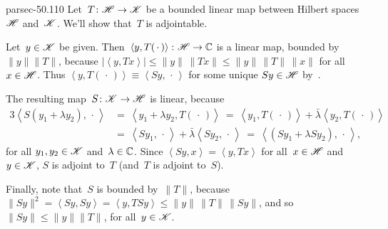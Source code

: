 \documentclass[b5page]{book}
\begin{document}
\begin{solution}{parsec-50.110}%
Let~$T\colon \mathscr{H}\to\mathscr{K}$
be a bounded linear map between Hilbert spaces
$\mathscr{H}$ and~$\mathscr{K}$.
We'll show that~$T$ is adjointable.

Let~$y \in \mathscr{K}$ be given. 
    Then~$\left<y,T(\,\cdot\,)\right>\colon \mathscr{H}\to\mathbb{C}$
    is a linear map,
    bounded by $\|y\|\|T\|$,
    because $\left|\left<y,Tx\right>\right|\leq
    \|y\|\, \|Tx\|\leq \|y\|\,\|T\|\,\|x\|$
    for all~$x\in \mathscr{H}$.
Thus $\left<y,T(\,\cdot\,)\right>\equiv \left<Sy,\,\cdot\,\right>$
    for some unique $Sy\in \mathscr{H}$ by~.

The resulting map~$S\colon \mathscr{K}\to\mathscr{H}$
is linear, because
    \begin{alignat*}{3}
\left<S(y_1+\lambda y_2),\,\cdot\,\right>
        &=\  \left< y_1+\lambda y_2, T(\,\cdot\,)\right>
    \ =\  \left<y_1,T(\,\cdot\,)\right> + 
    \bar\lambda\left<y_2,T(\,\cdot\,)\right>\\
        \ &=\  \left<Sy_1,\,\cdot\,\right> + 
    \bar\lambda\left<Sy_2,\,\cdot\,\right>
    \ =\  \left<(Sy_1+\lambda Sy_2),\,\cdot\,\right>,
\end{alignat*}
for all $y_1,y_2\in\mathscr{K}$ and~$\lambda\in\mathbb{C}$.
Since $\left<Sy,x\right>=\left<y,Tx\right>$
for all~$x\in\mathscr{H}$ and~$y\in\mathscr{K}$,
 $S$ is adjoint to~$T$ (and~$T$ is adjoint to~$S$).

Finally, note that~$S$ is bounded by~$\|T\|$,
because
$\|Sy\|^2 = \left<Sy,Sy\right>
= \left<y,TSy\right>
\leq \|y\|\,\|T\|\,\|Sy\|$,
and so~$\|Sy\|\leq \|y\|\|T\|$,
for all~$y\in\mathscr{K}$.
\end{solution}
\end{document}
